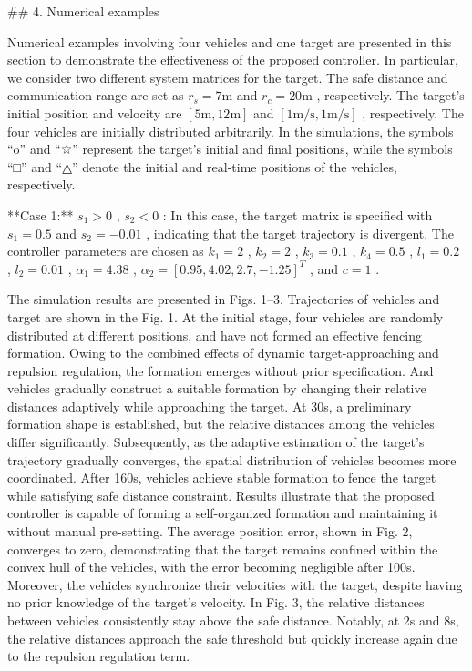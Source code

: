 ## 4. Numerical examples

Numerical examples involving four vehicles and one target are presented in this section to demonstrate the effectiveness of the proposed controller. In particular, we consider two different system matrices for the target. The safe distance and communication range are set as  $r_s = 7\text{m}$  and  $r_c = 20\text{m}$ , respectively. The target's initial position and velocity are  $[5\text{m}, 12\text{m}]$  and  $[1\text{m/s}, 1\text{m/s}]$ , respectively. The four vehicles are initially distributed arbitrarily. In the simulations, the symbols “o” and “☆” represent the target's initial and final positions, while the symbols “□” and “△” denote the initial and real-time positions of the vehicles, respectively.

**Case 1:**  $s_1 > 0$ ,  $s_2 < 0$ : In this case, the target matrix is specified with  $s_1 = 0.5$  and  $s_2 = -0.01$ , indicating that the target trajectory is divergent. The controller parameters are chosen as  $k_1 = 2$ ,  $k_2 = 2$ ,  $k_3 = 0.1$ ,  $k_4 = 0.5$ ,  $l_1 = 0.2$ ,  $l_2 = 0.01$ ,  $\alpha_1 = 4.38$ ,  $\alpha_2 = [0.95, 4.02, 2.7, -1.25]^T$ , and  $c = 1$ .

The simulation results are presented in Figs. 1–3. Trajectories of vehicles and target are shown in the Fig. 1. At the initial stage, four vehicles are randomly distributed at different positions, and have not formed an effective fencing formation. Owing to the combined effects of dynamic target-approaching and repulsion regulation, the formation emerges without prior specification. And vehicles gradually construct a suitable formation by changing their relative distances adaptively while approaching the target. At 30s, a preliminary formation shape is established, but the relative distances among the vehicles differ significantly. Subsequently, as the adaptive estimation of the target's trajectory gradually converges, the spatial distribution of vehicles becomes more coordinated. After 160s, vehicles achieve stable formation to fence the target while satisfying safe distance constraint. Results illustrate that the proposed controller is capable of forming a self-organized formation and maintaining it without manual pre-setting. The average position error, shown in Fig. 2, converges to zero, demonstrating that the target remains confined within the convex hull of the vehicles, with the error becoming negligible after 100s. Moreover, the vehicles synchronize their velocities with the target, despite having no prior knowledge of the target's velocity. In Fig. 3, the relative distances between vehicles consistently stay above the safe distance. Notably, at 2s and 8s, the relative distances approach the safe threshold but quickly increase again due to the repulsion regulation term.

